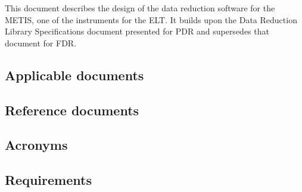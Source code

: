 \documentclass[11pt,oneside,a4paper]{article}
\begin{document}
This document describes the design of the data reduction software for the \ac{METIS}, one of the instruments for the \ac{ELT}. It builds upon
the Data Reduction Library Specifications document \cite{DRLS}
presented for \ac{PDR} and supersedes that document for \ac{FDR}.

\subsection{Applicable documents}

\begin{refcontext}[labelprefix=AD]
  \printbibliography[keyword=applicable, heading=none]
\end{refcontext}


\subsection{Reference documents}

\begin{refcontext}[labelprefix=RD]
  \printbibliography[keyword=reference, heading=none]
\end{refcontext}

\subsection{Acronyms}
\label{ssec:acronyms}


\subsection{Requirements}
\label{ssec:requirements}


\clearpage







% 


\clearpage
% 

\clearpage




% 
% 
% 
% 
% 
% 
% 


% 









\appendix



\end{document}
